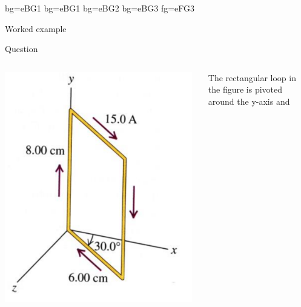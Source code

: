 %
%

{
 {bg=eBG1}
 {bg=eBG1}
 {bg=eBG2}
 {bg=eBG3}
 {fg=eFG3}

%
%
%

\begin{frame}{Worked example}

\begin{blockexmplque}{Question}

\begin{columns}
  \begin{column}{0.30\textwidth}
    \begin{center}
      \includegraphics[width=0.98\textwidth]{./images/problems/lect5_rectangular_loop}\\
    \end{center}
  \end{column}
  \begin{column}{0.70\textwidth}
    {\small
       The rectangular loop in the figure is pivoted around the y-axis and
}
\end{column}
\end{columns}
\end{blockexmplque}
\end{frame}}

